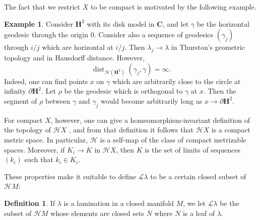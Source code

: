 \documentclass[reqno,10pt]{amsart}
\newcommand{\CC}{\mathbf{C}}
\newcommand{\Hyp}{\mathbf H}
\DeclareMathOperator{\dist}{dist}
\newcommand{\Leaves}{\mathscr L}
\newcommand{\Hypspace}{\mathscr H}
\theoremstyle{definition}
\newtheorem{definition}[theorem]{Definition}
\newtheorem{example}[theorem]{Example}
\numberwithin{equation}{section}
\begin{document}
The fact that we restrict $X$ to be compact is motivated by the following example.

\begin{example}
Consider $\Hyp^2$ with its disk model in $\CC$, and let $\gamma$ be the horizontal geodesic through the origin $0$.
Consider also a sequence of geodesics $(\gamma_j)$ through $i/j$ which are horizontal at $i/j$.
Then $\lambda_j \to \lambda$ in Thurston's geometric topology and in Hausdorff distance.
However,
$$\dist_{\mathscr H(\Hyp^2)}(\gamma_j, \gamma) = \infty.$$
Indeed, one can find points $x$ on $\gamma$ which are arbitrarily close to the circle at infinity $\partial \Hyp^2$.
Let $\rho$ be the geodesic which is orthogonal to $\gamma$ at $x$.
Then the segment of $\rho$ between $\gamma$ and $\gamma_j$ would become arbitrarily long as $x \to \partial \Hyp^2$.
\end{example}

For compact $X$, however, one can give a homeomorphism-invariant definition of the topology of $\Hypspace X$ \cite[Chapter 4]{nadler2017continuum}, and from that definition it follows that $\Hypspace X$ is a compact metric space.
In particular, $\Hypspace$ is a self-map of the class of compact metrizable spaces.
Moreover, if $K_i \to K$ in $\Hypspace X$, then $K$ is the set of limits of sequences $(k_i)$ such that $k_i \in K_i$.

These properties make it suitable to define $\Leaves \lambda$ to be a certain closed subset of $\Hypspace M$:

\begin{definition}
If $\lambda$ is a lamination in a closed manifold $M$, we let $\Leaves \lambda$ be the subset of $\Hypspace M$ whose elements are closed sets $\overline N$ where $N$ is a leaf of $\lambda$.
\end{definition}
\end{document}
